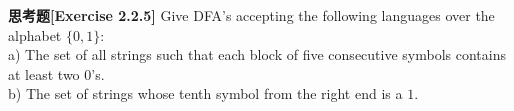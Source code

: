 \textbf{思考题[Exercise 2.2.5]} Give DFA's accepting the following languages 
over the alphabet $\{0,1\}$:\\
a) The set of all strings such that each block of five consecutive 
symbols contains at least two $0$'s.\\
b) The set of strings whose tenth symbol from the right end is a $1$.
